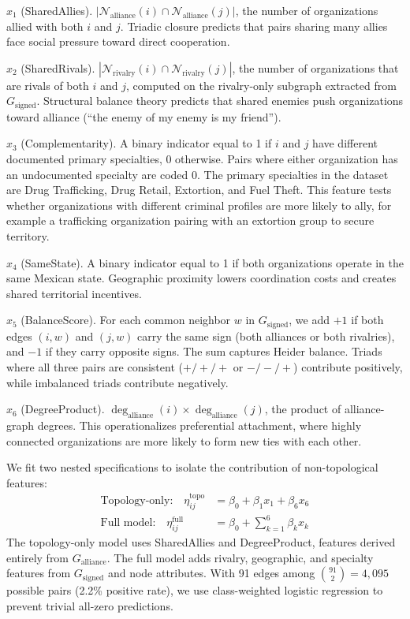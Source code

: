 \documentclass[11pt, a4paper]{article}
\begin{document}
\noindent $x_1$ (SharedAllies). $|\mathcal{N}_{\text{alliance}}(i) \cap \mathcal{N}_{\text{alliance}}(j)|$, the number of organizations allied with both $i$ and $j$. Triadic closure predicts that pairs sharing many allies face social pressure toward direct cooperation.

$x_2$ (SharedRivals). $|\mathcal{N}_{\text{rivalry}}(i) \cap \mathcal{N}_{\text{rivalry}}(j)|$, the number of organizations that are rivals of both $i$ and $j$, computed on the rivalry-only subgraph extracted from $G_{\text{signed}}$. Structural balance theory predicts that shared enemies push organizations toward alliance (``the enemy of my enemy is my friend'').

$x_3$ (Complementarity). A binary indicator equal to 1 if $i$ and $j$ have different documented primary specialties, 0 otherwise. Pairs where either organization has an undocumented specialty are coded 0. The primary specialties in the dataset are Drug Trafficking, Drug Retail, Extortion, and Fuel Theft. This feature tests whether organizations with different criminal profiles are more likely to ally, for example a trafficking organization pairing with an extortion group to secure territory.

$x_4$ (SameState). A binary indicator equal to 1 if both organizations operate in the same Mexican state. Geographic proximity lowers coordination costs and creates shared territorial incentives.

$x_5$ (BalanceScore). For each common neighbor $w$ in $G_{\text{signed}}$, we add $+1$ if both edges $(i,w)$ and $(j,w)$ carry the same sign (both alliances or both rivalries), and $-1$ if they carry opposite signs. The sum captures Heider balance. Triads where all three pairs are consistent ($+/+/+$ or $-/-/+$) contribute positively, while imbalanced triads contribute negatively.

$x_6$ (DegreeProduct). $\deg_{\text{alliance}}(i) \times \deg_{\text{alliance}}(j)$, the product of alliance-graph degrees. This operationalizes preferential attachment, where highly connected organizations are more likely to form new ties with each other.

\noindent We fit two nested specifications to isolate the contribution of non-topological features:
\begin{align}
    \text{Topology-only:} \quad \eta_{ij}^{\text{topo}} &= \beta_0 + \beta_1 x_1 + \beta_6 x_6 \label{eq:logistic_topo} \\[4pt]
    \text{Full model:} \quad \eta_{ij}^{\text{full}} &= \beta_0 + \sum_{k=1}^{6} \beta_k x_k \label{eq:logistic_full}
\end{align}
The topology-only model uses SharedAllies and DegreeProduct, features derived entirely from $G_{\text{alliance}}$. The full model adds rivalry, geographic, and specialty features from $G_{\text{signed}}$ and node attributes. With 91 edges among $\binom{91}{2} = 4{,}095$ possible pairs (2.2\% positive rate), we use class-weighted logistic regression to prevent trivial all-zero predictions.
\end{document}
